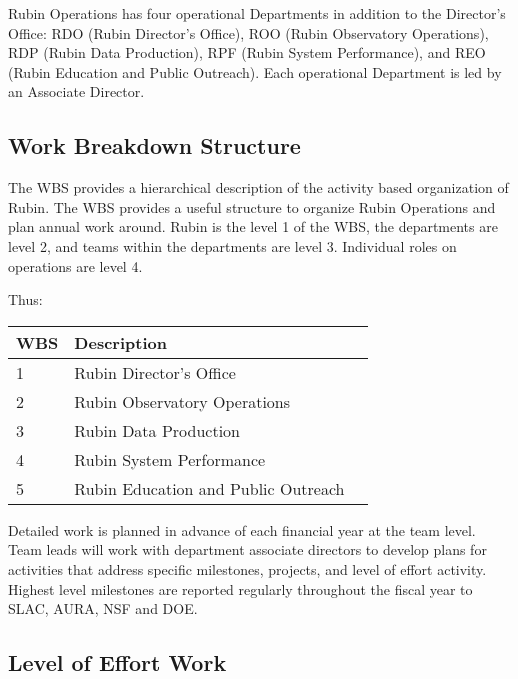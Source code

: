 Rubin Operations has four operational Departments in addition to the Director’s Office: RDO (Rubin Director’s Office), ROO (Rubin Observatory Operations), RDP (Rubin Data Production), RPF (Rubin System Performance), and REO (Rubin Education and Public Outreach). 
Each operational Department is led by an Associate Director.

\subsection{Work Breakdown Structure}
\label{sec:wbs}

The \gls{WBS} provides a hierarchical description of the activity based organization of Rubin. 
The WBS provides a useful structure to organize Rubin Operations and plan annual work around. 
Rubin is the level 1 of the WBS, the departments are level 2, and teams within the departments are level 3. 
Individual roles on operations are level 4.   

Thus:

\begin{longtable}[]{@{}lll@{}}
\hline
\gls{WBS} & Description \tabularnewline
\hline
\endhead

1 & Rubin Director's Office  \tabularnewline
2 & Rubin Observatory Operations  \tabularnewline
3 & Rubin Data Production \tabularnewline
4 & Rubin System Performance  \tabularnewline
5 & Rubin Education and Public Outreach \tabularnewline

\hline
\end{longtable}


Detailed work is planned in advance of each financial year at the team level. 
Team leads will work with department associate directors to develop plans for activities that address specific milestones, projects, and level of effort activity. 
Highest level milestones are reported regularly throughout the fiscal year to SLAC, AURA, NSF and DOE. 


\subsection{Level of Effort Work}
\label{sec:loe}

